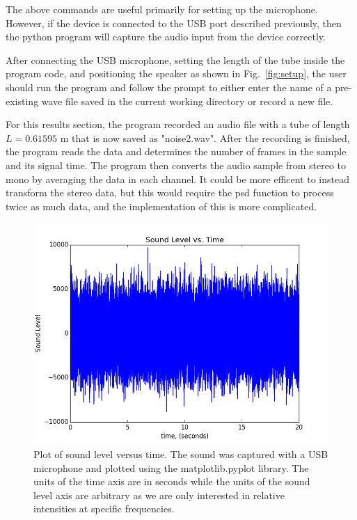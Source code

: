 \documentclass[12pt]{article}
\begin{document}
The above commands are useful primarily for setting up the microphone.
However, if the device is connected to the USB port described
previously, then the python program will capture the audio input from the
device correctly.

After connecting the USB microphone, setting the length of the tube inside
the program code, and positioning the speaker as shown in Fig.~\ref{fig:setup},
the user should run the program and follow the prompt to either enter the name
of a pre-existing wave file saved in the current working directory or record a
new file.

For this results section, the program recorded an audio file with a tube of
length $L = 0.61595$ m that is now saved as "noise2.wav". After the
recording is finished, the program reads the data and determines the
number of frames in the sample and its signal time.
The program then converts the audio sample from stereo to mono by averaging
the data in each channel. It could be more efficent to instead transform the
stereo data, but this would require the psd function to process twice as much
data, and the implementation of this is more complicated.

\begin{figure}[h]
\begin{center}
\includegraphics[width=300bp]{noise2_soundvtime.png}
\vspace{-18bp}
\end{center}
\caption[]{\label{fig:soundvtime}\small
Plot of sound level versus time. The sound was captured with a USB microphone 
and plotted using the matplotlib.pyplot library. The units of the time
axis are in seconds while the units of the sound level axis are arbitrary as
we are only interested in relative intensities at specific frequencies.
}
\end{figure}
\end{document}
